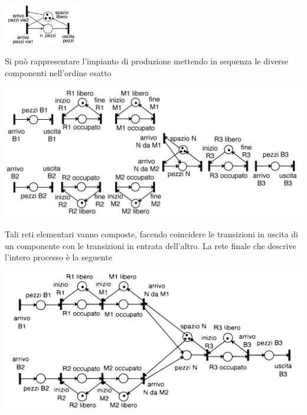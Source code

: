 \documentclass[10pt, letterpaper]{report}
\begin{document}
\begin{center}
    \includegraphics[width=0.25\textwidth]{images/buffer3.png}
\end{center}
Si può rappresentare l'impianto di produzione mettendo in sequenza le diverse componenti nell'ordine esatto
\begin{center}
    \includegraphics[width=\textwidth]{images/petriModeling2.png}
\end{center}
Tali reti elementari vanno composte, facendo coincidere le transizioni in uscita di un componente con le transizioni in entrata dell'altro. La rete finale che descrive l'intero processo è la seguente
\begin{center}
    \includegraphics[width=\textwidth]{images/petriModeling3.pdf}
\end{center}
\flowerLine 
\end{document}
